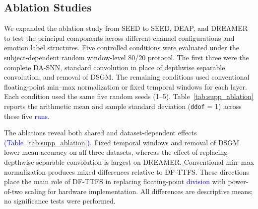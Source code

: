 \documentclass[12pt]{article}
\newcommand{\rev}[1]{\textcolor{blue}{#1}}
\begin{document}
\subsection{Ablation Studies}

We expanded the ablation study from SEED to SEED, DEAP, and DREAMER to test the principal components across different channel configurations and emotion label structures. Five controlled conditions were evaluated under the subject-dependent random window-level 80/20 protocol. The first three were the complete DA-SNN, standard convolution in place of depthwise separable convolution, and removal of DSGM. The remaining conditions used conventional floating-point min--max normalization or fixed temporal windows for each layer. Each condition used the same five random seeds (1--5). Table~\ref{tab:supp_ablation} reports the arithmetic mean and sample standard deviation (\texttt{ddof} = 1) across these five \rev{runs.}

The ablations reveal both shared and dataset-dependent effects \rev{(Table~\ref{tab:supp_ablation}).} Fixed temporal windows and removal of DSGM lower mean accuracy on all three datasets, whereas the effect of replacing depthwise separable convolution is largest on DREAMER. Conventional min--max normalization produces mixed differences relative to DF-TTFS. These directions place the main role of DF-TTFS in replacing floating-point \rev{division} with power-of-two scaling for hardware implementation. All differences are descriptive means; no significance tests were performed.
\end{document}
